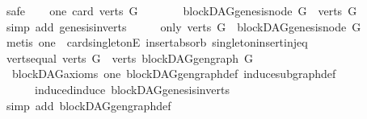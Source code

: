 \begin{isabellebody}
%
\isadelimproof
%
\endisadelimproof
%
\isatagproof
{}\isamarkupfalse%
\ {\isacharparenleft}{\kern0pt}safe{\isacharparenright}{\kern0pt}\isanewline
\ \ \isamarkupfalse%
\ one{\isacharcolon}{\kern0pt}\ {\isachardoublequoteopen}card\ {\isacharparenleft}{\kern0pt}verts\ G{\isacharparenright}{\kern0pt}\ {\isacharequal}{\kern0pt}\ {}{\isachardoublequoteclose}\isanewline
\ \ \isamarkupfalse%
\ \isamarkupfalse%
\ {\isachardoublequoteopen}blockDAG{\isachardot}{\kern0pt}genesis{\isacharunderscore}{\kern0pt}node\ G\ {\isasymin}\ verts\ G{\isachardoublequoteclose}\isanewline
\ \ \ \ \isamarkupfalse%
\ {\isacharparenleft}{\kern0pt}simp\ add{\isacharcolon}{\kern0pt}\ genesis{\isacharunderscore}{\kern0pt}in{\isacharunderscore}{\kern0pt}verts{\isacharparenright}{\kern0pt}\isanewline
\ \ \isamarkupfalse%
\ \isamarkupfalse%
\ only{\isacharcolon}{\kern0pt}\ {\isachardoublequoteopen}verts\ G\ {\isacharequal}{\kern0pt}\ {\isacharbraceleft}{\kern0pt}blockDAG{\isachardot}{\kern0pt}genesis{\isacharunderscore}{\kern0pt}node\ G{\isacharbraceright}{\kern0pt}{\isachardoublequoteclose}\isanewline
\ \ \ \ \isamarkupfalse%
\ {\isacharparenleft}{\kern0pt}metis\ one\ \ card{\isacharunderscore}{\kern0pt}{}{\isacharunderscore}{\kern0pt}singletonE\ insert{\isacharunderscore}{\kern0pt}absorb\ singleton{\isacharunderscore}{\kern0pt}insert{\isacharunderscore}{\kern0pt}inj{\isacharunderscore}{\kern0pt}eq{\isacharprime}{\kern0pt}{\isacharparenright}{\kern0pt}\isanewline
\ \ \isamarkupfalse%
\ \isamarkupfalse%
\ verts{\isacharunderscore}{\kern0pt}equal{\isacharcolon}{\kern0pt}\ {\isachardoublequoteopen}verts\ G\ {\isacharequal}{\kern0pt}\ verts\ {\isacharparenleft}{\kern0pt}blockDAG{\isachardot}{\kern0pt}gen{\isacharunderscore}{\kern0pt}graph\ G{\isacharparenright}{\kern0pt}{\isachardoublequoteclose}\isanewline
\ \ \ \ \isamarkupfalse%
\ \ blockDAG{\isacharunderscore}{\kern0pt}axioms\ one\ blockDAG{\isachardot}{\kern0pt}gen{\isacharunderscore}{\kern0pt}graph{\isacharunderscore}{\kern0pt}def\ induce{\isacharunderscore}{\kern0pt}subgraph{\isacharunderscore}{\kern0pt}def\isanewline
\ \ \ \ \ \ induced{\isacharunderscore}{\kern0pt}induce\ blockDAG{\isachardot}{\kern0pt}genesis{\isacharunderscore}{\kern0pt}in{\isacharunderscore}{\kern0pt}verts\isanewline
\ \ \ \ \isamarkupfalse%
\ {\isacharparenleft}{\kern0pt}simp\ add{\isacharcolon}{\kern0pt}\ blockDAG{\isachardot}{\kern0pt}gen{\isacharunderscore}{\kern0pt}graph{\isacharunderscore}{\kern0pt}def{\isacharparenright}{\kern0pt}\ \isanewline

\end{isabellebody}
